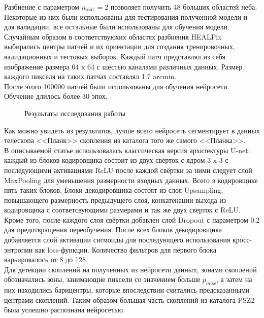 Разбиение с параметром $n_{side}=2$ позволяет получить 48 больших областей неба. Некоторые из них 
были использованы для тестирования полученной модели и для валидации, все остальные были 
использованы для обучения модели.\\ 

Случайным образом в соответствуюхих областях разбиения HEALPix выбирались центры патчей и их 
ориентации для создания тренировочных, валидационных и тестовых выборок. Каждый патч представлял 
из себя изображение размера 64 x 64 с шестью каналами различных данных. Размер каждого пикселя 
на таких патчах составлял 1.7 arcmin. \\

После этого 100000 патчей были использованы для обучения нейросети. Обучение длилось более 30 эпох. \\ 
\begin{figure}[h!]
	\center{\texttt{[image: sz0]}}
	\caption{Результаты исследования работы \cite{Bonjean}}
\end{figure}

Как можно увидеть из результатов, лучше всего нейросеть сегментирует в данных телескопа <<Планк>> 
скопления из каталога того же самого <<Планка>>.\\

В описываемой статье использовалась классическая версия архитектуры U-net: каждый из блоков 
кодировщика состоит из двух свёрток с ядром 3 x 3 с последующими активациями ReLU после каждой 
свёртки за ними следует слой MaxPooling для уменьшения размерности входных данных. Всего в 
кодировщике пять таких блоков. Блоки декодировщика состоят из слоя Upsampling, повышающего 
размерность предыдущего слоя, конкатенации выхода из кодировщика с соответсвующими размерами и 
так же двух сверток с ReLU. Кроме того, после каждого слоя свёртки добавлен слой Dropout с 
параметром 0.2 для предотвращения переобучения. После всех блоков декодировщика добавляется слой 
активации сигмоиды для последующего использования кросс-энтропии как loss-функции. Количество 
фильтров для первого блока варьировалось от 8 до 128.\\

Для детекции скоплений на полученных из нейросети данныx, зонами скоплений обозначались зоны, 
занимающие пиксели со значением больше $p_{max}$, а затем на них находились барицентры, которые 
впоследствии считались предсказанными центрами скоплений. Таким образом большая часть скоплений из 
каталога PSZ2 была успешно распознана нейросетью. \\
